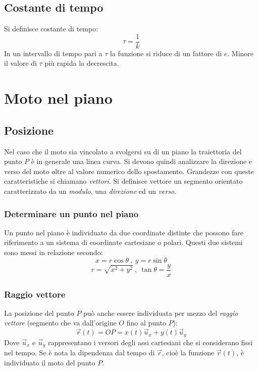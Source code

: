 \documentclass[class=book, crop=false, oneside, 12pt]{standalone}
\begin{document}
	\subsection{Costante di tempo}
	Si definisce costante di tempo:
	$$\tau = \dfrac{1}{k}$$
	In un intervallo di tempo pari a $\tau$ la funzione si riduce di un fattore di $e$.
	Minore il valore di $\tau$ pi\`u rapida la decrescita.

\section{Moto nel piano}
  \subsection{Posizione}
  Nel caso che il moto sia vincolato a svolgersi su di un piano la traiettoria del punto $P$ è in generale  una linea curva.
  Si devono quindi analizzare la direzione e verso del moto oltre al valore numerico dello spostamento.
  Grandezze con queste caratteristiche si chiamano \emph{vettori}.
  Si definisce vettore un segmento orientato caratterizzato da un \emph{modulo}, una \emph{direzione} ed un \emph{verso}.
    \subsubsection{Determinare un punto nel piano}
    Un punto nel piano \`e individuato da due coordinate distinte che possono fare riferimento a un sistema di coordinate cartesiane o polari.
    Questi due sistemi sono messi in relazione secondo:
    \begin{equation}
      x = r \cos \theta \ , \ y = r \sin \theta
    \end{equation}
    \begin{equation}
      r = \sqrt{x^2 + y^2 } \ , \ \tan \theta = \frac{y}{x}
    \end{equation}
    \subsubsection{Raggio vettore}
    La posizione del punto \(P\) può anche essere individuata per mezzo del \emph{raggio vettore} (segmento che va dall'origine \(O\) fino al punto \(P\)):
    \begin{equation}
      \overrightarrow{r}(t) = OP = x(t) \overrightarrow{u}_x + y(t) \overrightarrow{u}_y
    \end{equation}
    Dove \(\overrightarrow{u}_x\) e \(\overrightarrow{u}_y\) rappresentano i versori degli assi cartesiani che si considerano fissi nel tempo.
    Se è nota la dipendenza dal tempo di \(\overrightarrow{r}\), cioè la funzione \(\overrightarrow{r}(t)\), è individuato il moto del punto \(P\).
\end{document}
